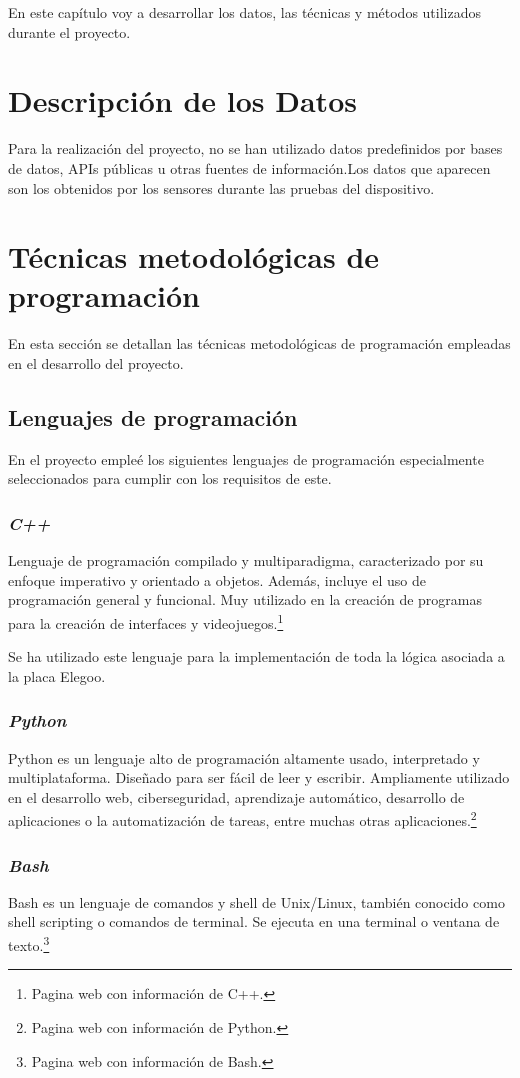 En este capítulo voy a desarrollar los datos, las técnicas y métodos utilizados durante el proyecto. 
\section{Descripción de los Datos}
Para la realización del proyecto, no se han utilizado datos predefinidos por bases de datos, APIs públicas u otras fuentes de información.Los datos que aparecen son los obtenidos por los sensores durante las pruebas del dispositivo.
\section{Técnicas metodológicas de programación}
En esta sección se detallan las técnicas metodológicas de programación empleadas en el desarrollo del proyecto. 
\subsection{Lenguajes de programación}
En el proyecto empleé los siguientes lenguajes de programación especialmente seleccionados para cumplir con los requisitos de este.
\subsubsection{\textit{C++}}
Lenguaje de programación compilado y multiparadigma, caracterizado por su enfoque imperativo y orientado a objetos. Además, incluye el uso de programación general y funcional.
Muy utilizado en la creación de programas para la creación de interfaces y videojuegos.\cite{C++}\footnote{Pagina web con información de C++\cite{C++}.}

Se ha utilizado este lenguaje para la implementación de toda la lógica asociada a la placa Elegoo.
\subsubsection{\textit{Python}}
Python es un lenguaje alto de programación altamente usado, interpretado y multiplataforma. Diseñado para ser fácil de leer y escribir.
Ampliamente utilizado en el desarrollo web, ciberseguridad, aprendizaje automático, desarrollo de aplicaciones o la automatización de tareas, entre muchas otras aplicaciones.\cite{Python}\footnote{Pagina web con información de Python\cite{Python}.}
\subsubsection{\textit{Bash}}
Bash es un lenguaje de comandos y shell de Unix/Linux, también conocido como shell scripting o comandos de terminal.
Se ejecuta en una terminal o ventana de texto.\cite{Bash}\footnote{Pagina web con información de Bash\cite{Bash}.}

